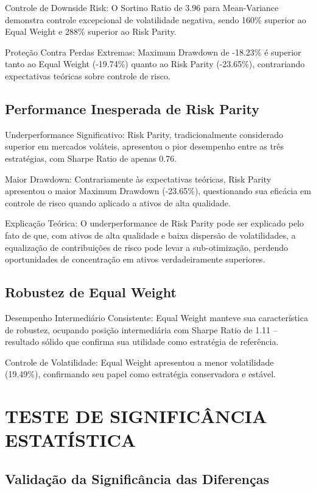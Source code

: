 Controle de Downside Risk: O Sortino Ratio de 3.96 para Mean-Variance demonstra controle excepcional de volatilidade negativa, sendo 160\% superior ao Equal Weight e 288\% superior ao Risk Parity.

Proteção Contra Perdas Extremas: Maximum Drawdown de -18.23\% é superior tanto ao Equal Weight (-19.74\%) quanto ao Risk Parity (-23.65\%), contrariando expectativas teóricas sobre controle de risco.

\subsection{Performance Inesperada de Risk Parity}

Underperformance Significativo: Risk Parity, tradicionalmente considerado superior em mercados voláteis, apresentou o pior desempenho entre as três estratégias, com Sharpe Ratio de apenas 0.76.

Maior Drawdown: Contrariamente às expectativas teóricas, Risk Parity apresentou o maior Maximum Drawdown (-23.65\%), questionando sua eficácia em controle de risco quando aplicado a ativos de alta qualidade.

Explicação Teórica: O underperformance de Risk Parity pode ser explicado pelo fato de que, com ativos de alta qualidade e baixa dispersão de volatilidades, a equalização de contribuições de risco pode levar a sub-otimização, perdendo oportunidades de concentração em ativos verdadeiramente superiores.

\subsection{Robustez de Equal Weight}

Desempenho Intermediário Consistente: Equal Weight manteve sua característica de robustez, ocupando posição intermediária com Sharpe Ratio de 1.11 – resultado sólido que confirma sua utilidade como estratégia de referência.

Controle de Volatilidade: Equal Weight apresentou a menor volatilidade (19.49\%), confirmando seu papel como estratégia conservadora e estável.

\section{TESTE DE SIGNIFICÂNCIA ESTATÍSTICA}

\subsection{Validação da Significância das Diferenças}

